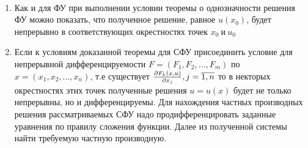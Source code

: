 \documentclass[../../main.tex]{subfiles}
\begin{document}
\begin{remark}

~

    \begin{enumerate}
        \item Как и для ФУ при выполнении условии 
        теоремы о однозначности решения ФУ можно показать,
        что полученное решение, равное $u\left(x_0\right)$,
        будет непрерывно в соответствующих окрестностях
        точек $x_0\ \text{и}\ u_0$
        \item Если к условиям доказанной теоремы для
        СФУ присоединить условие для непрерывной 
        дифференцируемости
        $F = \left(F_1, F_2, ..., F_m\right)$ по
        $x = \left(x_1, x_2, ..., x_n\right)$, т.е 
        существует
        $\frac{\partial F_k\left(x, u\right)}{\partial x_j}, 
        j = \overline{1, n}$ то в некторых окрестностях
        этих точек полученные решения 
        $u = u\left(x\right)$ будет не только 
        непрерывны, но и дифференцируемы.
        Для нахождения частных производных решения
        рассматриваемых СФУ надо продифференцировать
        заданные уравнения по правилу сложения функции.
        Далее из полученной системы найти требуемую частную производную. 
    \end{enumerate}
\end{remark}
\end{document}
